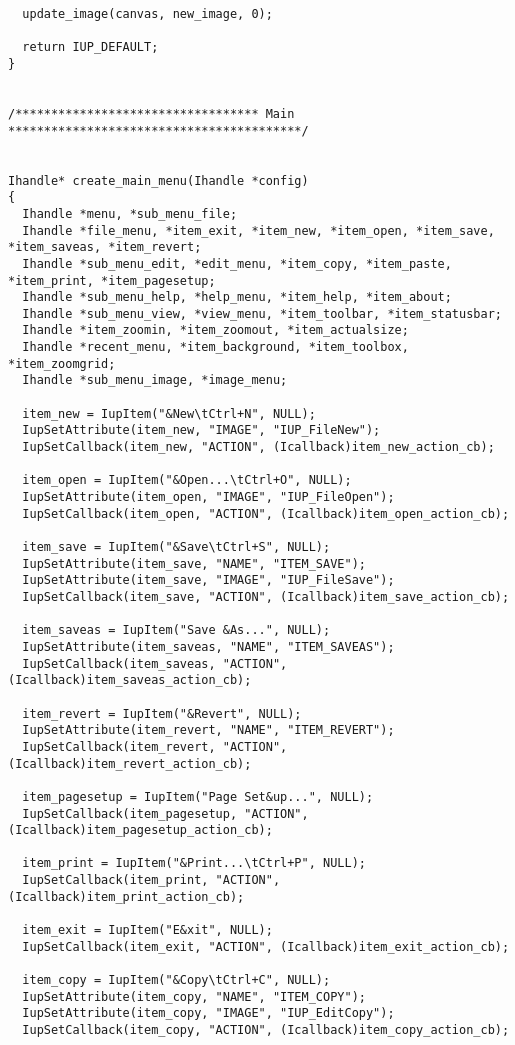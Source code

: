 \documentclass{ctexart}
\begin{document}
\begin{lstlisting}
  update_image(canvas, new_image, 0);

  return IUP_DEFAULT;
}


/********************************** Main *****************************************/


Ihandle* create_main_menu(Ihandle *config)
{
  Ihandle *menu, *sub_menu_file;
  Ihandle *file_menu, *item_exit, *item_new, *item_open, *item_save, *item_saveas, *item_revert;
  Ihandle *sub_menu_edit, *edit_menu, *item_copy, *item_paste, *item_print, *item_pagesetup;
  Ihandle *sub_menu_help, *help_menu, *item_help, *item_about;
  Ihandle *sub_menu_view, *view_menu, *item_toolbar, *item_statusbar;
  Ihandle *item_zoomin, *item_zoomout, *item_actualsize;
  Ihandle *recent_menu, *item_background, *item_toolbox, *item_zoomgrid;
  Ihandle *sub_menu_image, *image_menu;

  item_new = IupItem("&New\tCtrl+N", NULL);
  IupSetAttribute(item_new, "IMAGE", "IUP_FileNew");
  IupSetCallback(item_new, "ACTION", (Icallback)item_new_action_cb);

  item_open = IupItem("&Open...\tCtrl+O", NULL);
  IupSetAttribute(item_open, "IMAGE", "IUP_FileOpen");
  IupSetCallback(item_open, "ACTION", (Icallback)item_open_action_cb);

  item_save = IupItem("&Save\tCtrl+S", NULL);
  IupSetAttribute(item_save, "NAME", "ITEM_SAVE");
  IupSetAttribute(item_save, "IMAGE", "IUP_FileSave");
  IupSetCallback(item_save, "ACTION", (Icallback)item_save_action_cb);

  item_saveas = IupItem("Save &As...", NULL);
  IupSetAttribute(item_saveas, "NAME", "ITEM_SAVEAS");
  IupSetCallback(item_saveas, "ACTION", (Icallback)item_saveas_action_cb);

  item_revert = IupItem("&Revert", NULL);
  IupSetAttribute(item_revert, "NAME", "ITEM_REVERT");
  IupSetCallback(item_revert, "ACTION", (Icallback)item_revert_action_cb);

  item_pagesetup = IupItem("Page Set&up...", NULL);
  IupSetCallback(item_pagesetup, "ACTION", (Icallback)item_pagesetup_action_cb);

  item_print = IupItem("&Print...\tCtrl+P", NULL);
  IupSetCallback(item_print, "ACTION", (Icallback)item_print_action_cb);

  item_exit = IupItem("E&xit", NULL);
  IupSetCallback(item_exit, "ACTION", (Icallback)item_exit_action_cb);

  item_copy = IupItem("&Copy\tCtrl+C", NULL);
  IupSetAttribute(item_copy, "NAME", "ITEM_COPY");
  IupSetAttribute(item_copy, "IMAGE", "IUP_EditCopy");
  IupSetCallback(item_copy, "ACTION", (Icallback)item_copy_action_cb);


\end{lstlisting}
\end{document}
